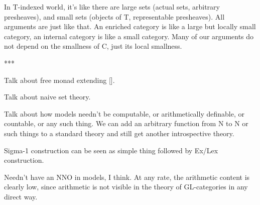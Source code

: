 In T-indexed world, it's like there are large sets (actual sets, arbitrary presheaves), and small sets (objects of T, representable presheaves). All arguments are just like that. An enriched category is like a large but locally small category, an internal category is like a small category. Many of our arguments do not depend on the smallness of C, just its local smallness.

***

Talk about free monad extending [].

Talk about naive set theory.

Talk about how models needn't be computable, or arithmetically definable, or countable, or any such thing. We can add an arbitrary function from N to N or such things to a standard theory and still get another introspective theory.

Sigma-1 construction can be seen as simple thing followed by Ex/Lex construction.

Needn't have an NNO in models, I think. At any rate, the arithmetic content is clearly low, since arithmetic is not visible in the theory of GL-categories in any direct way.